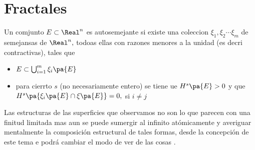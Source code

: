 \chapter{Fractales}


Un comjunto $E\subset \Real^n$ es autosemejante si existe una coleccion $\xi_1,\xi_2 \cdots \xi_m$ de semejansas de $\Real^n,$ todoas ellas con razones menores a la unidad (es decri contractivas), tales que

\begin{itemize}
  \item $E\subset \bigcup^m_{i=1}\xi_i\pa{E}$
  \item para cierrto $s$ (no necesariamente entero) se tiene ue $H^s\pa{E}>0$ y que $H^s\pa{\xi_i\pa{E}\cap \xi\pa{E}}=0,$ si $i\neq j$
\end{itemize}

Las estructuras de las superficies que observamos no son lo que parecen con una finitud limitada mas aun se puede sumergir al infinito atómicamente y averiguar mentalmente la composición estructural de tales formas, desde  la concepción de este tema e podrá cambiar el modo de ver de las cosas .

